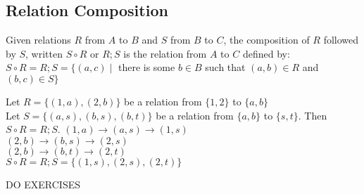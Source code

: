 \documentclass[../notes.tex]{subfiles}
\begin{document}
			\subsection{Relation Composition}
				Given relations $R$ from $A$ to $B$ and $S$ from $B$ to $C$, the composition of $R$ followed by $S$, written $S \circ R$ or $R;S$ is the relation from $A$ to $C$ defined by:\\
				$S \circ R = R;S = \bigl\{(a, c) \mid$ there is some $b \in B$ such that $(a, b) \in R$ and $(b, c) \in S\bigr\}$
				\begin{examplebox}
					Let $R = \bigl\{(1, a), (2, b)\bigr\}$ be a relation from $\{1, 2\}$ to $\{a, b\}$\\
					Let $S = \bigl\{(a, s), (b, s), (b, t)\bigr\}$ be a relation from $\{a, b\}$ to $\{s, t\}$.
					Then $S \circ R = R;S$.
					\-\hspace{1cm} $(1, a) \rightarrow (a, s) \rightarrow (1, s)$\\
					\-\hspace{1cm} $(2, b) \rightarrow (b, s) \rightarrow (2, s)$\\
					\-\hspace{1cm} $(2, b) \rightarrow (b, t) \rightarrow (2, t)$\\
					$S \circ R = R;S = \bigl\{(1, s), (2, s), (2, t)\bigr\}$
				\end{examplebox}
				DO EXERCISES
\end{document}
